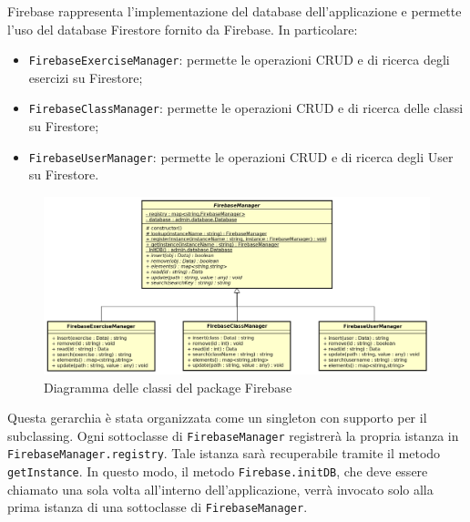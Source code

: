 Firebase rappresenta l'implementazione del database dell'applicazione e permette l'uso del database Firestore fornito da Firebase. In particolare:
\begin{itemize}
	\item \texttt{FirebaseExerciseManager}: permette le operazioni CRUD e di ricerca degli esercizi su Firestore;
	\item \texttt{FirebaseClassManager}: permette le operazioni CRUD e di ricerca delle classi su Firestore;
	\item \texttt{FirebaseUserManager}: permette le operazioni CRUD e di ricerca degli User su Firestore.
\end{itemize}

\begin{figure}[h]
	\includegraphics[scale=0.5]{images/FirebaseManager.png}
	\caption{Diagramma delle classi del package Firebase}
\end{figure}


Questa gerarchia è stata organizzata come un singleton con supporto per il subclassing. Ogni sottoclasse di \texttt{FirebaseManager} registrerà la propria istanza in \texttt{FirebaseManager.registry}. Tale istanza sarà recuperabile tramite il metodo \texttt{getInstance}. In questo modo, il metodo \texttt{Firebase.initDB}, che deve essere chiamato una sola volta all'interno dell'applicazione, verrà invocato solo alla prima istanza di una sottoclasse di \texttt{FirebaseManager}.